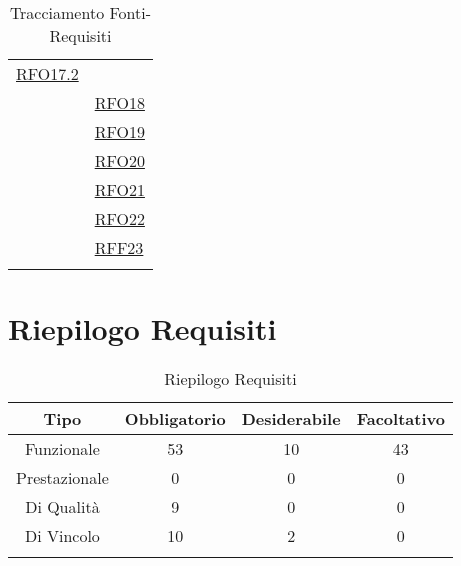 \begin{longtable}{|>{\centering}m{5cm}|m{5cm}<{\centering}|}
	\hyperlink{RFO17.2}{RFO17.2}\\ & \hyperlink{RFO18}{RFO18}\\ & \hyperlink{RFO19}{RFO19}\\ & \hyperlink{RFO20}{RFO20}\\ & \hyperlink{RFO21}{RFO21}\\ & \hyperlink{RFO22}{RFO22}\\ & \hyperlink{RFF23}{RFF23}\\ \hline
	\caption[Tracciamento Fonti-Requisiti]{Tracciamento Fonti-Requisiti}
	\label{tabella:fonti-requi}
\end{longtable}
\clearpage

\section{Riepilogo Requisiti}
\normalsize
\begin{longtable}{|c|c|c|c|}
	\hline 
	\textbf{Tipo} & \textbf{Obbligatorio} & \textbf{Desiderabile} & \textbf{Facoltativo}\\
	\hline
	Funzionale & 53 & 10 & 43\\ \hline
	Prestazionale & 0 & 0 & 0\\ \hline
	Di Qualità & 9 & 0 & 0\\ \hline
	Di Vincolo & 10 & 2 & 0\\ \hline
	\caption[Riepilogo Requisiti]{Riepilogo Requisiti}
	\label{tabella:riepilogorequi}
\end{longtable}
\clearpage


